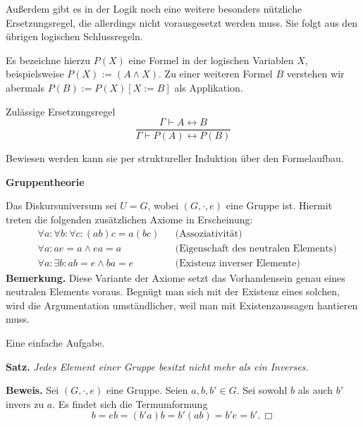 \documentclass[8pt]{beamer}
\newcommand{\strong}[1]{\textsf{\textbf{#1}}}
\renewcommand{\qedsymbol}{\ensuremath{\Box}}
\newcommand{\centerheadline}[1]{%
  \begin{center}\strong{#1}\end{center}}
\newcommand{\parspace}{\vspace{0.8em}}
\begin{document}
\begin{frame}
Außerdem gibt es in der Logik noch eine weitere besonders nützliche
Ersetzungsregel, die allerdings nicht vorausgesetzt werden muss.
Sie folgt aus den übrigen logischen Schlussregeln.

\parspace
Es bezeichne hierzu $P(X)$ eine Formel in der logischen Variablen $X$,
beispielsweise $P(X) := (A\land X)$. Zu einer weiteren Formel
$B$ verstehen wir abermals $P(B):=P(X)[X:=B]$ als Applikation.\pause

\begin{block}{Zulässige Ersetzungsregel}
\[\dfrac{\Gamma\vdash A\leftrightarrow B}{\Gamma\vdash P(A)\leftrightarrow P(B)}\]
\end{block}\pause
Bewiesen werden kann sie per struktureller Induktion über den
Formelaufbau.
\end{frame}

\begin{frame}
\centerheadline{Gruppentheorie}
\end{frame}

\begin{frame}
Das Diskursuniversum sei $U=G$, wobei $(G,\cdot,e)$ eine Gruppe ist.
Hiermit treten die folgenden zusätzlichen Axiome in Erscheinung:
\begin{align*}
& \forall a\colon\forall b\colon\forall c\colon (ab)c = a(bc) && \text{(Assoziativität)}\\
& \forall a\colon ae = a\land ea = a && \text{(Eigenschaft des neutralen Elements)}\\
& \forall a\colon\exists b\colon ab = e\land ba = e && \text{(Existenz inverser Elemente)}
\end{align*}\pause
{\footnotesize\strong{Bemerkung.} Diese Variante der Axiome setzt
das Vorhandensein genau eines neutralen Elements voraus. Begnügt man
sich mit der Existenz eines solchen, wird die Argumentation umständlicher,
weil man mit Existenzaussagen hantieren muss.}
\end{frame}

\begin{frame}
Eine einfache Aufgabe.

\vspace{1em}
\strong{Satz.} \emph{Jedes Element einer Gruppe besitzt nicht mehr
als ein Inverses.}\pause

\parspace
\strong{Beweis.}
Sei $(G,\cdot,e)$ eine Gruppe. Seien $a,b,b'\in G$.
Sei sowohl $b$ als auch $b'$ invers zu $a$. Es findet sich die
Termumformung
\[b = eb = (b'a)b = b'(ab) = b'e = b'.\,\qedsymbol\]
\end{frame}
\end{document}
